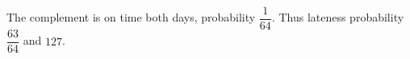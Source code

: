 The complement is on time both days, probability $\dfrac{1}{64}$. Thus lateness probability $\dfrac{63}{64}$ and $\boxed{127}$.
